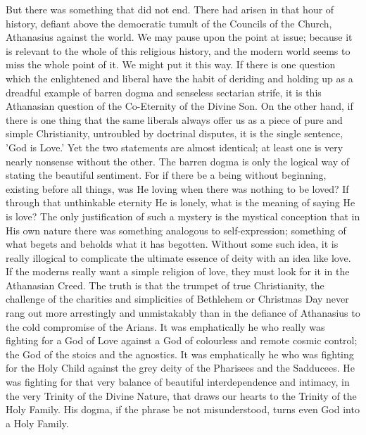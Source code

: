 But there was something that did not end. There had arisen in that hour of history, defiant above the democratic tumult of the Councils of the Church, Athanasius against the world. We may pause upon the point at issue; because it is relevant to the whole of this religious history, and the modern world seems to miss the whole point of it. We might put it this way. If there is one question which the enlightened and liberal have the habit of deriding and holding up as a dreadful example of barren dogma and senseless sectarian strife, it is this Athanasian question of the Co-Eternity of the Divine Son. On the other hand, if there is one thing that the same liberals always offer us as a piece of pure and simple Christianity, untroubled by doctrinal disputes, it is the single sentence, 'God is Love.' Yet the two statements are almost identical; at least one is very nearly nonsense without the other. The barren dogma is only the logical way of stating the beautiful sentiment. For if there be a being without beginning, existing before all things, was He loving when there was nothing to be loved? If through that unthinkable eternity He is lonely, what is the meaning of saying He is love? The only justification of such a mystery is the mystical conception that in His own nature there was something analogous to self-expression; something of what begets and beholds what it has begotten. Without some such idea, it is really illogical to complicate the ultimate essence of deity with an idea like love. If the moderns really want a simple religion of love, they must look for it in the Athanasian Creed. The truth is that the trumpet of true Christianity, the challenge of the charities and simplicities of Bethlehem or Christmas Day never rang out more arrestingly and unmistakably than in the defiance of Athanasius to the cold compromise of the Arians. It was emphatically he who really was fighting for a God of Love against a God of colourless and remote cosmic control; the God of the stoics and the agnostics. It was emphatically he who was fighting for the Holy Child against the grey deity of the Pharisees and the Sadducees. He was fighting for that very balance of beautiful interdependence and intimacy, in the very Trinity of the Divine Nature, that draws our hearts to the Trinity of the Holy Family. His dogma, if the phrase be not misunderstood, turns even God into a Holy Family.

